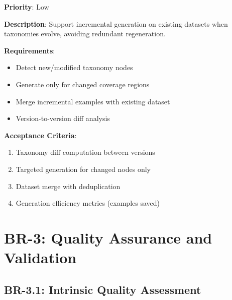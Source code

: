 \documentclass[12pt,a4paper,twoside]{report}
\begin{document}
\begin{tcolorbox}[colback=green!5,colframe=green!70,title=BR-2.5: Incremental Generation Support]
\textbf{Priority}: Low

\textbf{Description}: Support incremental generation on existing datasets when
taxonomies evolve, avoiding redundant regeneration.

\textbf{Requirements}:
\begin{itemize}
\item Detect new/modified taxonomy nodes
\item Generate only for changed coverage regions
\item Merge incremental examples with existing dataset
\item Version-to-version diff analysis
\end{itemize}

\textbf{Acceptance Criteria}:
\begin{enumerate}
\item Taxonomy diff computation between versions
\item Targeted generation for changed nodes only
\item Dataset merge with deduplication
\item Generation efficiency metrics (examples saved)
\end{enumerate}
\end{tcolorbox}


\section{BR-3: Quality Assurance and Validation}

\subsection{BR-3.1: Intrinsic Quality Assessment}
\end{document}
